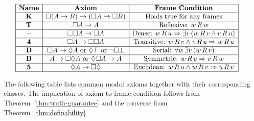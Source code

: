 \begin{table}[h]
  \centering
  \[
  \begin{array}{|c|c|c|}
  \hline
  \textbf{Name} & \textbf{Axiom} & \textbf{Frame Condition} \\
  \hline
  \textbf{K} & \Box (A \to B) \to (\Box A \to \Box B) 
            & \text{Holds true for any frames} \\
  \hline
  \textbf{T} & \Box A \to A 
            & \text{Reflexive: } w\,R\,w \\
  \hline
  - & \Box\Box A \to \Box A 
    & \text{Dense: } w\,R\,u \Rightarrow \exists v\,(w\,R\,v \land v\,R\,u) \\
  \hline
  \textbf{4} & \Box A \to \Box\Box A 
            & \text{Transitive: } w\,R\,v \wedge v\,R\,u \Rightarrow w\,R\,u \\
  \hline
  \textbf{D} & \Box A \to \Diamond A \text{ or } \Diamond\top \text{ or } \neg\Box\bot 
            & \text{Serial: } \forall w\,\exists v\,(w\,R\,v) \\
  \hline
  \textbf{B} & A \to \Box\Diamond A \text{ or } \Diamond\Box A \to A 
            & \text{Symmetric: } w\,R\,v \Rightarrow v\,R\,w \\
  \hline
  \textbf{5} & \Diamond A \to \Box\Diamond  
            & \text{Euclidean: } w\,R\,u \land w\,R\,v \Rightarrow u\,R\,v \\
  \hline
  \end{array}
  \]
  \caption{The following table lists common modal axioms together with their corresponding classes. 
  The implication of axiom to frame condition follows from Theorem~\ref{thm:truth-guarantee} and the converse from Theorem~\ref{thm:definability}}
  \label{tab:table-schemata-relations}
\end{table}



